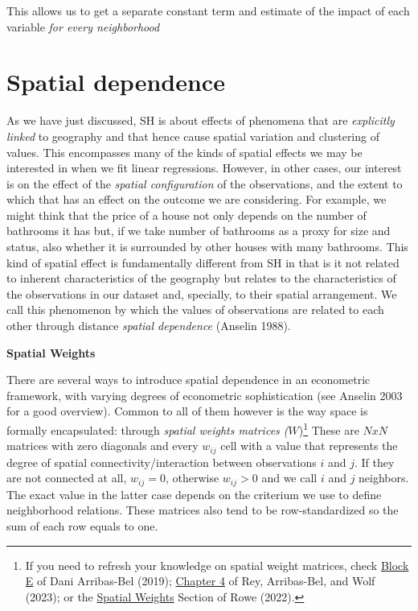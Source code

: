 \documentclass[
  letterpaper,
  DIV=11,
  numbers=noendperiod,
  oneside]{scrreprt}
\begin{document}
This allows us to get a separate constant term and estimate of the
impact of each variable \emph{for every neighborhood}

\section{Spatial dependence}\label{spatial-dependence-1}

As we have just discussed, SH is about effects of phenomena that are
\emph{explicitly linked} to geography and that hence cause spatial
variation and clustering of values. This encompasses many of the kinds
of spatial effects we may be interested in when we fit linear
regressions. However, in other cases, our interest is on the effect of
the \emph{spatial configuration} of the observations, and the extent to
which that has an effect on the outcome we are considering. For example,
we might think that the price of a house not only depends on the number
of bathrooms it has but, if we take number of bathrooms as a proxy for
size and status, also whether it is surrounded by other houses with many
bathrooms. This kind of spatial effect is fundamentally different from
SH in that is it not related to inherent characteristics of the
geography but relates to the characteristics of the observations in our
dataset and, specially, to their spatial arrangement. We call this
phenomenon by which the values of observations are related to each other
through distance \emph{spatial dependence} (Anselin 1988).

\textbf{Spatial Weights}

There are several ways to introduce spatial dependence in an econometric
framework, with varying degrees of econometric sophistication (see
Anselin 2003 for a good overview). Common to all of them however is the
way space is formally encapsulated: through \emph{spatial weights
matrices (}\(W\))\footnote{If you need to refresh your knowledge on
  spatial weight matrices, check
  \href{https://darribas.org/gds_course/content/bE/concepts_E.html}{Block
  E} of Dani Arribas-Bel (2019);
  \href{https://geographicdata.science/book/notebooks/04_spatial_weights.html}{Chapter
  4} of Rey, Arribas-Bel, and Wolf (2023); or the
  \href{https://fcorowe.github.io/intro-gds/03-spatial_weights.html}{Spatial
  Weights} Section of Rowe (2022).} These are \(NxN\) matrices with zero
diagonals and every \(w_{ij}\) cell with a value that represents the
degree of spatial connectivity/interaction between observations \(i\)
and \(j\). If they are not connected at all, \(w_{ij}=0\), otherwise
\(w_{ij}>0\) and we call \(i\) and \(j\) neighbors. The exact value in
the latter case depends on the criterium we use to define neighborhood
relations. These matrices also tend to be row-standardized so the sum of
each row equals to one.
\end{document}

